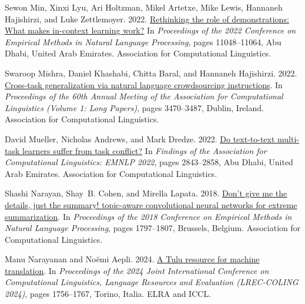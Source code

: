 \documentclass[11pt]{article}
\begin{document}
\begin{thebibliography}{88}
    Sewon Min, Xinxi Lyu, Ari Holtzman, Mikel Artetxe, Mike Lewis, Hannaneh Hajishirzi, and Luke Zettlemoyer. 2022.
    \newblock \href {https://doi.org/10.18653/v1/2022.emnlp-main.759} {Rethinking the role of demonstrations: What makes in-context learning work?}
    \newblock In \emph{Proceedings of the 2022 Conference on Empirical Methods in Natural Language Processing}, pages 11048--11064, Abu Dhabi, United Arab Emirates. Association for Computational Linguistics.
    
    Swaroop Mishra, Daniel Khashabi, Chitta Baral, and Hannaneh Hajishirzi. 2022.
    \newblock \href {https://doi.org/10.18653/v1/2022.acl-long.244} {Cross-task generalization via natural language crowdsourcing instructions}.
    \newblock In \emph{Proceedings of the 60th Annual Meeting of the Association for Computational Linguistics (Volume 1: Long Papers)}, pages 3470--3487, Dublin, Ireland. Association for Computational Linguistics.
    
    David Mueller, Nicholas Andrews, and Mark Dredze. 2022.
    \newblock \href {https://doi.org/10.18653/v1/2022.findings-emnlp.206} {Do text-to-text multi-task learners suffer from task conflict?}
    \newblock In \emph{Findings of the Association for Computational Linguistics: EMNLP 2022}, pages 2843--2858, Abu Dhabi, United Arab Emirates. Association for Computational Linguistics.
    
    Shashi Narayan, Shay~B. Cohen, and Mirella Lapata. 2018.
    \newblock \href {https://doi.org/10.18653/v1/D18-1206} {Don{'}t give me the details, just the summary! topic-aware convolutional neural networks for extreme summarization}.
    \newblock In \emph{Proceedings of the 2018 Conference on Empirical Methods in Natural Language Processing}, pages 1797--1807, Brussels, Belgium. Association for Computational Linguistics.
    
    Manu Narayanan and No{\"e}mi Aepli. 2024.
    \newblock \href {https://aclanthology.org/2024.lrec-main.155} {A {T}ulu resource for machine translation}.
    \newblock In \emph{Proceedings of the 2024 Joint International Conference on Computational Linguistics, Language Resources and Evaluation (LREC-COLING 2024)}, pages 1756--1767, Torino, Italia. ELRA and ICCL.
    

\end{thebibliography}
\end{document}
